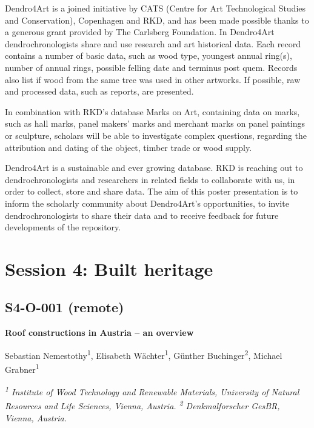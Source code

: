 \documentclass[
]{book}
\begin{document}
Dendro4Art is a joined initiative by CATS (Centre for Art Technological Studies and Conservation), Copenhagen and RKD, and has been made possible thanks to a generous grant provided by The Carlsberg Foundation. In Dendro4Art dendrochronologists share and use research and art historical data. Each record contains a number of basic data, such as wood type, youngest annual ring(s), number of annual rings, possible felling date and terminus post quem. Records also list if wood from the same tree was used in other artworks. If possible, raw and processed data, such as reports, are presented.

In combination with RKD's database Marks on Art, containing data on marks, such as hall marks, panel makers' marks and merchant marks on panel paintings or sculpture, scholars will be able to investigate complex questions, regarding the attribution and dating of the object, timber trade or wood supply.

Dendro4Art is a sustainable and ever growing database. RKD is reaching out to dendrochronologists and researchers in related fields to collaborate with us, in order to collect, store and share data. The aim of this poster presentation is to inform the scholarly community about Dendro4Art's opportunities, to invite dendrochronologists to share their data and to receive feedback for future developments of the repository.

\hypertarget{session-4-built-heritage}{%
\chapter*{Session 4: Built heritage}\label{session-4-built-heritage}}

\hypertarget{s4-o-001-remote}{%
\section*{S4-O-001 (remote)}\label{s4-o-001-remote}}

\textbf{Roof constructions in Austria -- an overview}

Sebastian Nemestothy\textsuperscript{1}, Elisabeth Wächter\textsuperscript{1}, Günther Buchinger\textsuperscript{2}, Michael Grabner\textsuperscript{1}

\emph{\textsuperscript{1} Institute of Wood Technology and Renewable Materials, University of Natural Resources and Life Sciences, Vienna, Austria. \textsuperscript{2} Denkmalforscher GesBR, Vienna, Austria.}
\end{document}
